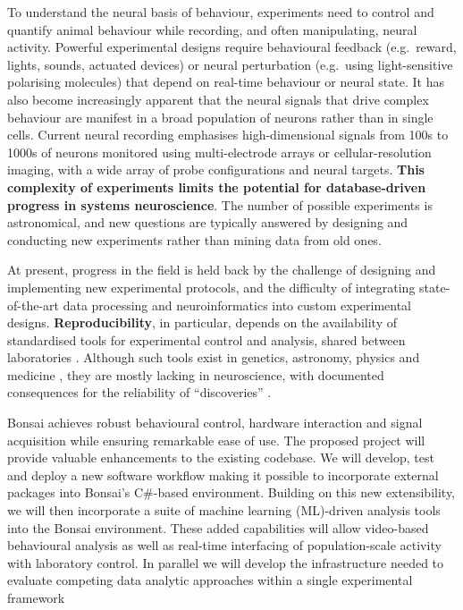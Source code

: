 To understand the neural basis of behaviour, experiments need to control and quantify animal behaviour while recording, and often manipulating, neural activity. 
%
Powerful experimental designs require behavioural feedback (e.g.\ reward, lights, sounds, actuated
devices) or neural perturbation (e.g.\ using light-sensitive polarising
molecules) that depend on real-time behaviour or neural state.
%
It has also become increasingly apparent that the neural signals that
drive complex behaviour are manifest in a broad population of neurons rather
than in single cells. Current neural recording emphasises high-dimensional
signals from 100s to 1000s of neurons monitored using multi-electrode arrays or cellular-resolution imaging, with a wide array of probe configurations and neural targets.
%
\textbf{This complexity of experiments limits the potential for database-driven progress in systems neuroscience}. The number of possible experiments is astronomical, and new questions are typically answered by designing and conducting new experiments rather than mining data from old ones.

At present, progress in the field is held back by the challenge of designing and implementing new experimental protocols, and the difficulty of integrating state-of-the-art data processing and neuroinformatics into custom experimental designs.
%
\textbf{Reproducibility}, in particular, depends on the availability of
standardised tools for experimental control and analysis, shared between
laboratories \citep{baker16,ioannidis05}. Although such tools exist in
genetics, astronomy, physics and medicine 
\citep{fishEtAl16,abdallaEtAl18,cern18,dickinsonEtAl16,bycroftEtAl18}, they are
mostly lacking in neuroscience, with documented consequences for the
reliability of ``discoveries'' \citep{baker16,botvinikNezerEtAl20,buttonEtAl13}. 




Bonsai achieves robust behavioural control, hardware interaction and signal acquisition while ensuring remarkable ease of use.  The proposed project will provide valuable enhancements to the existing codebase.  We will develop, test and deploy a new software workflow making it possible to incorporate external packages into Bonsai's C\#-based environment.  Building on this new extensibility, we will then incorporate a suite of machine learning (ML)-driven analysis tools into the Bonsai environment.  These added capabilities will allow  video-based behavioural analysis as well as real-time interfacing of population-scale activity with laboratory control.  In parallel we will develop the infrastructure needed to evaluate competing data analytic approaches within a single experimental framework

